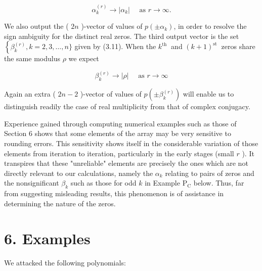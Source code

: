 \documentclass[10pt]{article}
\begin{document}
\begin{equation*}
\alpha_{k}^{(r)} \rightarrow\left|\alpha_{k}\right| \quad \text { as } r \rightarrow \infty . \tag{5.2}
\end{equation*}


We also output the ( $2 n$ )-vector of values of $p\left( \pm \alpha_{k}\right)$, in order to resolve the sign ambiguity for the distinct real zeros. The third output vector is the set $\left\{\beta_{k}^{(r)}, k=\right. 2,3, \ldots, n\}$ given by (3.11). When the $k^{\text {th }}$ and $(k+1)^{\text {st }}$ zeros share the same modulus $\rho$ we expect


\begin{equation*}
\beta_{k}^{(r)} \rightarrow|\rho| \quad \text { as } r \rightarrow \infty \tag{5.3}
\end{equation*}


Again an extra ( $2 n-2$ )-vector of values of $p\left( \pm \beta_{k}^{(r)}\right)$ will enable us to distinguish readily the case of real multiplicity from that of complex conjugacy.

Experience gained through computing numerical examples such as those of Section 6 shows that some elements of the array may be very sensitive to rounding errors. This sensitivity shows itself in the considerable variation of those elements from iteration to iteration, particularly in the early stages (small $r$ ). It transpires that these "unreliable" elements are precisely the ones which are not directly relevant to our calculations, namely the $\alpha_{k}$ relating to pairs of zeros and the nonsignificant $\beta_{k}$ such as those for odd $k$ in Example $\mathrm{P}_{\mathrm{C}}$ below. Thus, far from suggesting misleading results, this phenomenon is of assistance in determining the nature of the zeros.

\section*{6. Examples}
We attacked the following polynomials:
\end{document}
